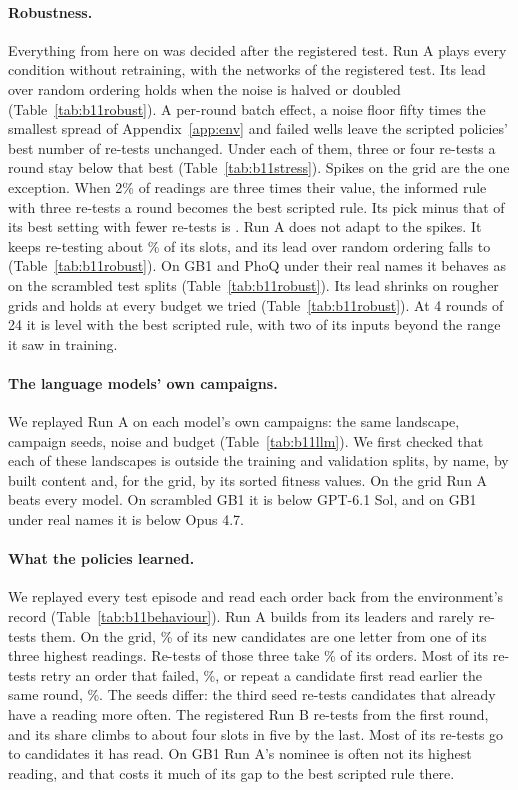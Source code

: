\paragraph{Robustness.} Everything from here on was decided after the registered test. Run A plays every condition without retraining, with
the networks of the registered test. Its lead over random ordering holds when the noise is halved or doubled
(Table~\ref{tab:b11robust}). A per-round batch effect, a noise floor fifty times the smallest spread of Appendix~\ref{app:env} and failed wells leave the
scripted policies' best number of re-tests unchanged. Under each of them, three or four re-tests a round stay below
that best (Table~\ref{tab:b11stress}). Spikes on the grid are the one exception. When 2\% of readings are three times their
value, the informed rule with three re-tests a round becomes the best scripted rule. Its pick minus that of its best
setting with fewer re-tests is \nPolSpikeHeavy{} \nPolSpikeHeavyci. Run A does not adapt to the spikes. It keeps
re-testing about \nPolShare\% of its slots, and its lead over random ordering falls to \nPolRandSpike{}
\nPolRandSpikeci{} (Table~\ref{tab:b11robust}). On GB1 and PhoQ under their real names it behaves as on the scrambled
test splits (Table~\ref{tab:b11robust}). Its lead shrinks on rougher grids and holds at every budget we tried
(Table~\ref{tab:b11robust}). At 4 rounds of 24 it is level with the best scripted rule, with two of its inputs beyond the range it saw in training.

\paragraph{The language models' own campaigns.} We replayed Run A on each model's own campaigns: the same
landscape, campaign seeds, noise and budget (Table~\ref{tab:b11llm}). We first checked that each of these landscapes
is outside the training and validation splits, by name, by built content and, for the grid, by its sorted fitness values. On
the grid Run A beats every model. On scrambled GB1 it is below GPT-6.1 Sol, and on GB1 under real names it is below
Opus 4.7.

\paragraph{What the policies learned.} We replayed every test episode and read each order back from the
environment's record (Table~\ref{tab:b11behaviour}). Run A builds from its leaders and rarely re-tests them. On the
grid, \nPolParentTopThree\% of its new candidates are one letter from one of its three highest readings. Re-tests of
those three take \nPolLeadRetest\% of its orders. Most of its re-tests retry an order that failed, \nPolRetry\%, or
repeat a candidate first read earlier the same round, \nPolSameRound\%. The seeds differ: the third seed re-tests candidates that already have a reading more often. The registered Run B re-tests from the first round, and its share climbs to about four slots in five by the
last. Most of its re-tests go to candidates it has read. On GB1 Run A's nominee is often not its highest reading, and
that costs it much of its gap to the best scripted rule there.


